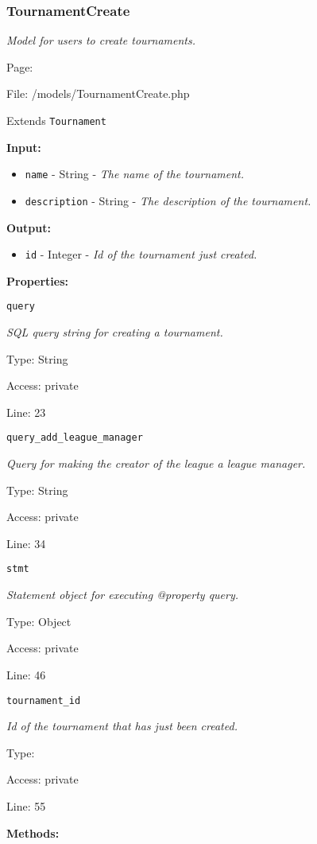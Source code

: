 \subsubsection{TournamentCreate}\label{TournamentCreate.php.doc}
\textit{Model for users to create tournaments.}

Page: \pageref{TournamentCreate.php}

File: /models/TournamentCreate.php

Extends \texttt{Tournament}

\textbf{Input:}
\begin{itemize}
\item \texttt{name} - String - \textit{The name of the tournament.}
\item \texttt{description} - String - \textit{The description of the tournament.}
\end{itemize}

\textbf{Output:}
\begin{itemize}
\item \texttt{id} - Integer - \textit{Id of the tournament just created.}
\end{itemize}

\textbf{Properties:}

\texttt{query}

{\scriptsize
\textit{SQL query string for creating a tournament.}

Type: String

Access: private

Line: 23

}
\texttt{query\_add\_league\_manager}

{\scriptsize
\textit{Query for making the creator of the league a league manager.}

Type: String

Access: private

Line: 34

}
\texttt{stmt}

{\scriptsize
\textit{Statement object for executing @property query.}

Type: Object

Access: private

Line: 46

}
\texttt{tournament\_id}

{\scriptsize
\textit{Id of the tournament that has just been created.}

Type: 

Access: private

Line: 55

}
\textbf{Methods:}

